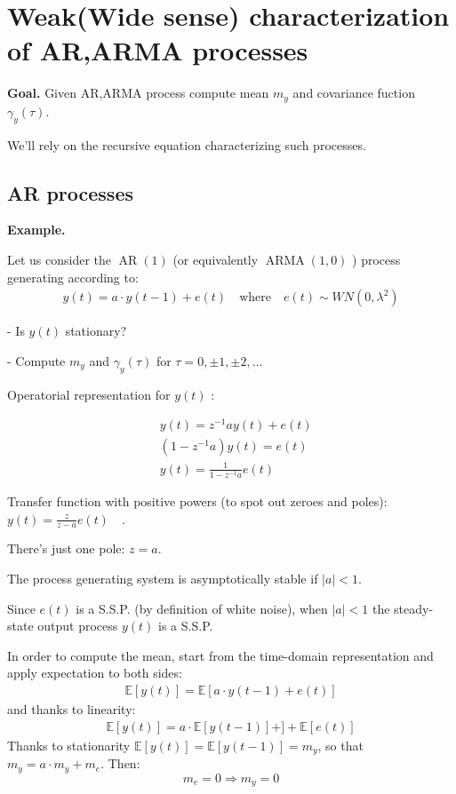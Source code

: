 
\section{Weak(Wide sense) characterization of AR,ARMA processes}
\textbf{Goal.} Given AR,ARMA process compute mean $m_y$ and covariance fuction $\gamma_y(\tau)$.


We'll rely on the recursive equation characterizing such processes.

\subsection{AR processes}
\textbf{Example.}

Let us consider the $\operatorname{AR}(1)$ (or equivalently $\operatorname{ARMA}(1,0)$ ) process generating according to:
\begin{align*}
	y(t)=a \cdot y(t-1)+e(t) \quad \text{where} \quad e(t) \sim W N\left(0, \lambda^{2}\right)
\end{align*}

- Is $y(t)$ stationary?

- Compute $m_{y}$ and $\gamma_{y}(\tau)$ for $\tau=0, \pm 1, \pm 2, \ldots$

Operatorial representation for $y(t)$ :

\begin{align*}
	&y(t)=z^{-1} a y(t)+e(t) \\
	&\left(1-z^{-1} a\right) y(t)=e(t) \\
	&y(t)=\frac{1}{1-z^{-1} a} e(t)
\end{align*}

Transfer function with positive powers (to spot out zeroes and poles): $y(t)=\frac{z}{z-a} e(t) \quad$.

There's just one pole: $z=a .$

The process generating system is asymptotically stable if $|a| <1$. 

Since $e(t)$ is a S.S.P. (by definition of white noise), when $|a| <1$ the steady-state output process $y(t)$ is a S.S.P.

In order to compute the mean, start from the time-domain representation and apply expectation to 
both sides:
\begin{align*}
	\mathbb{E}[y(t)]=\mathbb{E}[a \cdot y(t-1)+e(t)]
\end{align*}
and thanks to linearity:
\begin{align*}
	\mathbb{E}[y(t)]=a \cdot \mathbb{E}[y(t-1)]+]+\mathbb{E}[e(t)]
\end{align*}
Thanks to stationarity $\mathbb{E}[y(t)]=\mathbb{E}[y(t-1)]=m_{y}$, so that $m_{y}=a \cdot m_{y}+m_{e}$.
Then:
$$
m_{e}=0 \Rightarrow m_{y}=0
$$

